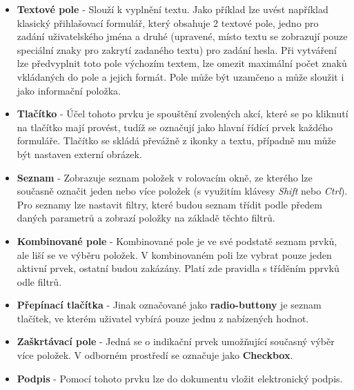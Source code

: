 	\begin{itemize}
	\item \textbf{Textové pole} - Slouží k vyplnění textu. Jako příklad lze uvést například klasický přihlašovací formulář, který obsahuje 2 textové pole, jedno pro zadání uživatelského jména a druhé (upravené, místo textu se zobrazují pouze speciální znaky pro zakrytí zadaného textu)  pro zadání hesla. Při vytváření lze předvyplnit toto pole výchozím textem, lze omezit maximální počet znaků vkládaných do pole a jejich formát. Pole může být uzamčeno a může sloužit i jako informační položka.
	\item \textbf{Tlačítko} - Účel tohoto prvku je spouštění zvolených akcí, které se po kliknutí na tlačítko mají provést, tudíž se označují jako hlavní řídící prvek každého formuláře. Tlačítko se skládá převážně z ikonky a textu, případně mu může být nastaven externí obrázek.
	\item \textbf{Seznam} - Zobrazuje seznam položek v rolovacím okně, ze kterého lze současně označit jeden nebo více položek (s využitím klávesy \textit{Shift} nebo \textit{Ctrl}). Pro seznamy lze nastavit filtry, které budou seznam třídit podle předem daných parametrů a zobrazí položky na základě těchto filtrů.
	\item \textbf{Kombinované pole} - Kombinované pole je ve své podstatě seznam prvků, ale liší se ve výběru položek. V kombinovaném poli lze vybrat pouze jeden aktivní prvek, ostatní budou zakázány. Platí zde pravidla s tříděním pprvků odle filtrů.
	\item \textbf{Přepínací tlačítka} - Jinak označované jako \textbf{radio-buttony} je seznam tlačítek, ve kterém uživatel vybírá pouze jednu z nabízených hodnot.
	\item \textbf{Zaškrtávací pole} - Jedná se o indikační prvek umožňující současný výběr více položek. V odborném prostředí se označuje jako \textbf{Checkbox}.
	\item \textbf{Podpis} - Pomocí tohoto prvku lze do dokumentu vložit elektronický podpis.
	\end{itemize}